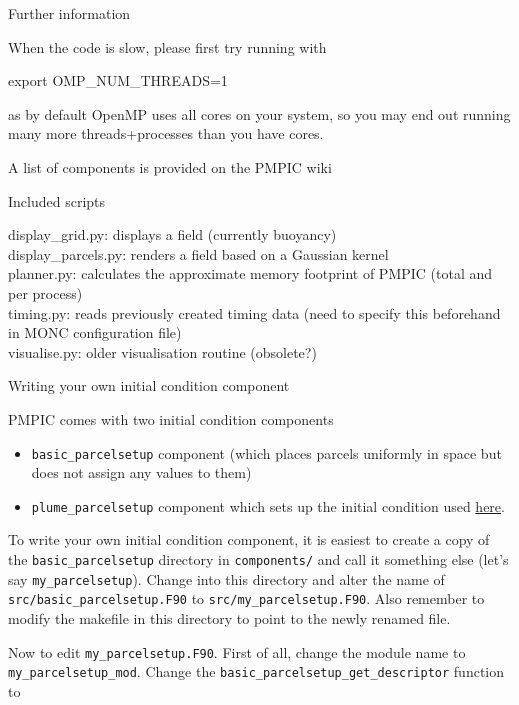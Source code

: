 \documentclass{beamer}
\newenvironment{Shaded}{}{}
\newcommand{\VariableTok}[1]{\textcolor[rgb]{0.00,0.00,0.00}{{#1}}}
\newcommand{\BuiltInTok}[1]{{#1}}
\newcommand{\NormalTok}[1]{{#1}}
\begin{document}
\begin{frame}[fragile]{Further information}
\protect\hypertarget{further information}{}

When the code is slow, please first try running with

\begin{Shaded}
\begin{Highlighting}[]
\BuiltInTok{export} \VariableTok{OMP_NUM_THREADS=}\NormalTok{1}
\end{Highlighting}
\end{Shaded}

as by default OpenMP uses all cores on your system, so you may end out
running many more threads+processes than you have cores.

A list of components is provided on the PMPIC wiki

\end{frame}

\begin{frame}{Included scripts}
\protect\hypertarget{included-scripts}{}

display\_grid.py: displays a field (currently buoyancy)\\
display\_parcels.py: renders a field based on a Gaussian kernel\\
planner.py: calculates the approximate memory footprint of PMPIC (total
and per process)\\
timing.py: reads previously created timing data (need to specify this
beforehand in MONC configuration file)\\
visualise.py: older visualisation routine (obsolete?)

\end{frame}

\begin{frame}[fragile]{Writing your own initial condition component}
\protect\hypertarget{writing-your-own-initial-condition-component}{}

PMPIC comes with two initial condition components
\begin{itemize}
\item \texttt{basic\_parcelsetup} component (which places parcels uniformly in
space but does not assign any values to them)
\item \texttt{plume\_parcelsetup} component which sets up the initial
condition used
\href{https://rmets.onlinelibrary.wiley.com/doi/10.1002/qj.3319}{here}.
\end{itemize}

To write your own initial condition component, it is easiest to create a
copy of the \texttt{basic\_parcelsetup} directory in
\texttt{components/} and call it something else (let's say
\texttt{my\_parcelsetup}). Change into this directory and alter the name
of \texttt{src/basic\_parcelsetup.F90} to
\texttt{src/my\_parcelsetup.F90}. Also remember to modify the makefile
in this directory to point to the newly renamed file.

Now to edit \texttt{my\_parcelsetup.F90}. First of all, change the
module name to \texttt{my\_parcelsetup\_mod}. Change the
\texttt{basic\_parcelsetup\_get\_descriptor} function to
\end{frame}
\end{document}

